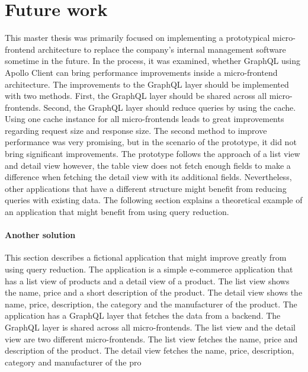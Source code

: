 \chapter{Future work}\label{chapter:future-work}

This master thesis was primarily focused on implementing a prototypical micro-frontend architecture to replace the company's internal management software sometime in the future. In the process, it was examined, whether GraphQL using Apollo Client can bring performance improvements inside a micro-frontend architecture. The improvements to the GraphQL layer should be implemented with two methods. First, the GraphQL layer should be shared across all micro-frontends. Second, the GraphQL layer should reduce queries by using the cache. Using one cache instance for all micro-frontends leads to great improvements regarding request size and response size. The second method to improve performance was very promising, but in the scenario of the prototype, it did not bring significant improvements. The prototype follows the approach of a list view and detail view however, the table view does not fetch enough fields to make a difference when fetching the detail view with its additional fields. Nevertheless, other applications that have a different structure might benefit from reducing queries with existing data. The following section explains a theoretical example of an application that might benefit from using query reduction.

\subsubsection{Another solution}

This section describes a fictional application that might improve greatly from using query reduction. The application is a simple e-commerce application that has a list view of products and a detail view of a product. The list view shows the name, price and a short description of the product. The detail view shows the name, price, description, the category and the manufacturer of the product. The application has a GraphQL layer that fetches the data from a backend. The GraphQL layer is shared across all micro-frontends. The list view and the detail view are two different micro-frontends. The list view fetches the name, price and description of the product. The detail view fetches the name, price, description, category and manufacturer of the pro

